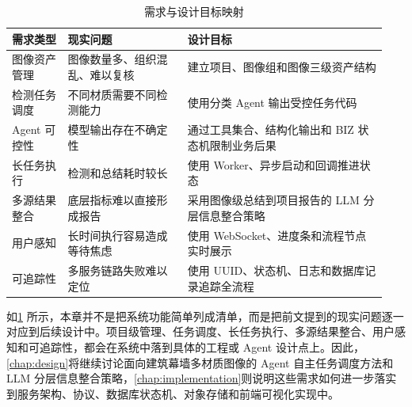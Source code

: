 \begin{table}[!htb]
  \caption{需求与设计目标映射}\label{tab:requirement-goal-map}
  \centering
  \begin{tabular}{@{}p{0.14\linewidth}p{0.3\linewidth}p{0.5\linewidth}@{}} \toprule
    \textbf{需求类型} & \textbf{现实问题} & \textbf{设计目标} \\ \midrule
    图像资产管理 & 图像数量多、组织混乱、难以复核 & 建立项目、图像组和图像三级资产结构 \\
    检测任务调度 & 不同材质需要不同检测能力 & 使用分类 Agent 输出受控任务代码 \\
    Agent 可控性 & 模型输出存在不确定性 & 通过工具集合、结构化输出和 BIZ 状态机限制业务后果 \\
    长任务执行 & 检测和总结耗时较长 & 使用 Worker、异步启动和回调推进状态 \\
    多源结果整合 & 底层指标难以直接形成报告 & 采用图像级总结到项目报告的 LLM 分层信息整合策略 \\
    用户感知 & 长时间执行容易造成等待焦虑 & 使用 WebSocket、进度条和流程节点实时展示 \\
    可追踪性 & 多服务链路失败难以定位 & 使用 UUID、状态机、日志和数据库记录追踪全流程 \\ \bottomrule
  \end{tabular}
\end{table}

如\cref{tab:requirement-goal-map} 所示，本章并不是把系统功能简单列成清单，而是把前文提到的现实问题逐一对应到后续设计中。项目级管理、任务调度、长任务执行、多源结果整合、用户感知和可追踪性，都会在系统中落到具体的工程或 Agent 设计点上。因此，\cref{chap:design}将继续讨论面向建筑幕墙多材质图像的 Agent 自主任务调度方法和 LLM 分层信息整合策略，\cref{chap:implementation}则说明这些需求如何进一步落实到服务架构、协议、数据库状态机、对象存储和前端可视化实现中。
